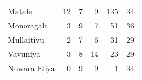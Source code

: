 \begin{tabular}{lrrrrr}
Matale       &          12 &           7 &            9 &              135 &          34 \\
Moneragala   &           3 &           9 &            7 &               51 &          36 \\
Mullaitivu   &           2 &           7 &            6 &               31 &          29 \\
Vavuniya     &           3 &           8 &           14 &               23 &          29 \\
Nuwara Eliya &           0 &           9 &            9 &                1 &          34 \\
\bottomrule
\end{tabular}

